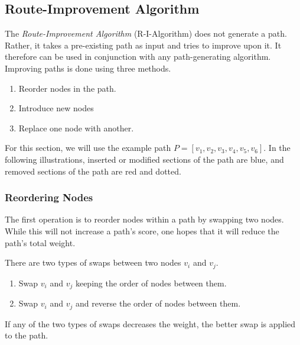 \subsection{Route-Improvement Algorithm}
\label{subsec:03:rialgo}

\iffalse
\begin{wrapfigure}{r}{0.45\textwidth}
	\centering
	\scalebox{0.78}{
		\begin{tikzpicture}[vertex/.style={draw}]
			\foreach \a in {1,...,6}{
					\draw (216-\a*360/10: 2.6cm) node (\a) {$v_\a$};
				}
			\draw[->] (1) -- (2);
			\draw[->] (2) -- (3);
			\draw[->] (3) -- (4);
			\draw[->] (4) -- (5);
			\draw[->] (5) -- (6);
		\end{tikzpicture}
		\vspace{-10pt}
	}
	\caption{A path generated by some algorithm.}
	\label{fig:03:rialgoreorderpath}
\end{wrapfigure}
\fi

The \emph{Route-Improvement Algorithm} (R-I-Algorithm) does not generate a path.
Rather, it takes a pre-existing path as input and tries to improve upon it.
It therefore can be used in conjunction with any path-generating algorithm.
Improving paths is done using three methods.

\begin{enumerate}
	\itemsep0em
	\item Reorder nodes in the path.
	\item Introduce new nodes
	\item Replace one node with another.
\end{enumerate}

For this section, we will use the example path $P = [v_1, v_2, v_3, v_4, v_5, v_6]$.
In the following illustrations, inserted or modified sections of the path are blue, and removed sections of the path are red and dotted.

\subsubsection{Reordering Nodes}
\label{subsubsec:03:reorder}

The first operation is to reorder nodes within a path by swapping two nodes.
While this will not increase a path's score, one hopes that it will reduce the path's total weight.

There are two types of swaps between two nodes $v_i$ and $v_j$.
\begin{enumerate}
	\itemsep0em
	\item Swap $v_i$ and $v_j$ keeping the order of nodes between them.
	\item Swap $v_i$ and $v_j$ and reverse the order of nodes between them.
\end{enumerate}
If any of the two types of swaps decreases the weight, the better swap is applied to the path.

